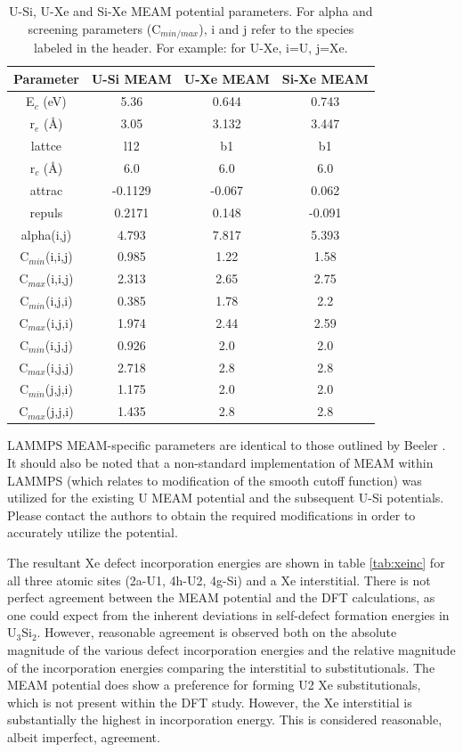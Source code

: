 \documentclass[review]{elsarticle}
\begin{document}
\begin{table}[h]
\caption{U-Si, U-Xe and Si-Xe MEAM potential parameters. For alpha and screening parameters (C$_{min/max}$), i and j refer to the species labeled in the header. For example: for U-Xe, i=U, j=Xe. }\label{tab:meam}
\begin{center}
\begin{tabular}{|c|c|c|c|}
 \hline
 Parameter & U-Si MEAM \cite{beelerusi} & U-Xe MEAM & Si-Xe MEAM \\
 \hline
 E$_{c}$ (eV) & 5.36 & 0.644 & 0.743 \\ 
 r$_{e}$ (\AA) & 3.05 & 3.132 & 3.447 \\
 lattce & l12 & b1 & b1\\
 r$_{c}$ (\AA) & 6.0 & 6.0 & 6.0\\
 attrac & -0.1129 & -0.067 & 0.062 \\
 repuls & 0.2171 & 0.148 & -0.091 \\
 alpha(i,j) & 4.793 & 7.817 & 5.393 \\
 C$_{min}$(i,i,j) & 0.985 &1.22 & 1.58\\
 C$_{max}$(i,i,j) & 2.313 & 2.65 & 2.75\\
 C$_{min}$(i,j,i) & 0.385 & 1.78 & 2.2 \\
 C$_{max}$(i,j,i) & 1.974 & 2.44 & 2.59\\
 C$_{min}$(i,j,j) & 0.926 & 2.0 & 2.0\\
 C$_{max}$(i,j,j) & 2.718 & 2.8 & 2.8\\
 C$_{min}$(j,j,i) & 1.175 & 2.0 & 2.0\\ 
 C$_{max}$(j,j,i) & 1.435 & 2.8 & 2.8 \\
 \hline
\end{tabular}
\end{center}
\label{default}
\end{table}%

\FloatBarrier

LAMMPS MEAM-specific parameters are identical to those outlined by Beeler \cite{beelerusi}. It should also be noted that a non-standard implementation of MEAM within LAMMPS (which relates to modification of the smooth cutoff function) was utilized for the existing U MEAM potential and the subsequent U-Si potentials. Please contact the authors to obtain the required modifications in order to accurately utilize the potential. 

The resultant Xe defect incorporation energies are shown in table \ref{tab:xeinc} for all three atomic sites (2a-U1, 4h-U2, 4g-Si) and a Xe interstitial. There is not perfect agreement between the MEAM potential and the DFT calculations, as one could expect from the inherent deviations in self-defect formation energies in U$_3$Si$_2$. However, reasonable agreement is observed both on the absolute magnitude of the various defect incorporation energies and the relative magnitude of the incorporation energies comparing the interstitial to substitutionals. The MEAM potential does show a preference for forming U2 Xe substitutionals, which is not present within the DFT study. However, the Xe interstitial is substantially the highest in incorporation energy. This is considered reasonable, albeit imperfect, agreement. 
\end{document}
